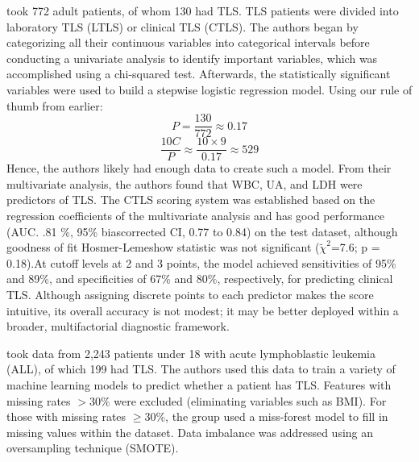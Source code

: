 \documentclass{article}
\begin{document}
\cite{mato2004predictive} took 772 adult patients, of whom 130 had TLS. TLS patients were divided into laboratory TLS (LTLS) or clinical TLS (CTLS). The authors began by categorizing all their continuous variables into categorical intervals before conducting a univariate analysis to identify important variables, which was accomplished using a chi-squared test. Afterwards, the statistically significant variables were used to build a stepwise logistic regression model. Using our rule of thumb from earlier:
\[P =\frac{130}{772} \approx 0.17 \]
\[ \frac{10C}{P} \approx \frac{10\times9}{0.17} \approx 529 \]
Hence, the authors likely had enough data to create such a model. From their multivariate analysis, the authors found that WBC, UA, and LDH were predictors of TLS. 
The CTLS scoring system was established based on the regression coefficients of the multivariate analysis and has good performance (AUC. .81 \%, 95\% bias\-corrected CI, 0.77 to 0.84) on the test dataset, although goodness of fit Hosmer-Lemeshow statistic was not significant (\(\tilde{\chi}^2\)=7.6; p = 0.18).At cut\-off levels at 2 and 3 points, the model achieved sensitivities of 95\% and 89\%, and specificities of 67\% and 80\%, respectively, for predicting clinical TLS. Although assigning discrete points to each predictor makes the score intuitive, its overall accuracy is not modest; it may be better deployed within a broader, multifactorial diagnostic framework.


\cite{xiao2024prediction} took data from 2,243 patients under 18 with acute lymphoblastic leukemia (ALL), of which 199 had TLS. The authors used this data to train a variety of machine learning models to predict whether a patient has TLS. Features with missing rates $> 30\%$ were excluded (eliminating variables such as BMI). For those with missing rates $\ge 30\%$, the group used a miss-forest model to fill in missing values within the dataset.  Data imbalance was addressed using an oversampling technique (SMOTE).
\end{document}
